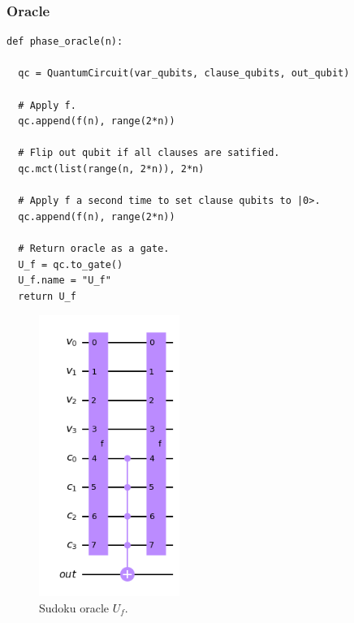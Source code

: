 \documentclass{article}
\begin{document}
\subsubsection{Oracle}
\begin{verbatim}
def phase_oracle(n):

  qc = QuantumCircuit(var_qubits, clause_qubits, out_qubit)

  # Apply f.
  qc.append(f(n), range(2*n))

  # Flip out qubit if all clauses are satified.
  qc.mct(list(range(n, 2*n)), 2*n)

  # Apply f a second time to set clause qubits to |0>.
  qc.append(f(n), range(2*n))

  # Return oracle as a gate.
  U_f = qc.to_gate()
  U_f.name = "U_f"
  return U_f
\end{verbatim}
\begin{figure}[H]
  \centering
  \includegraphics[width=130pt]{Img/uf-circuit.png}
  \caption{Sudoku oracle $U_f$.}
\end{figure}

\newpage
\end{document}
